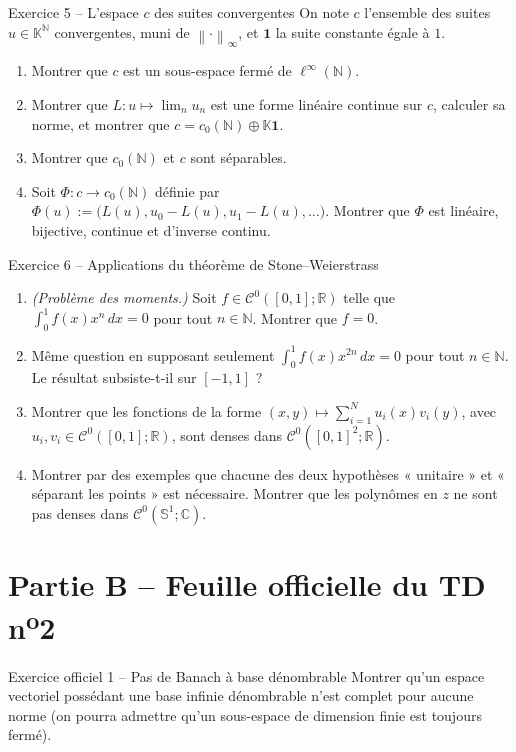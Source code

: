 \documentclass[11pt,a4paper]{article}
\newcommand{\R}{\mathbb{R}}
\newcommand{\N}{\mathbb{N}}
\newcommand{\C}{\mathbb{C}}
\newcommand{\K}{\mathbb{K}}
\newcommand{\Sun}{\mathbb{S}^1}
\newcommand{\norm}[1]{\left\|#1\right\|}
\newcommand{\Cz}{\mathcal{C}^0}
\theoremstyle{definition}
\begin{document}
\begin{exo}{Exercice 5 -- L'espace $c$ des suites convergentes}
On note $c$ l'ensemble des suites $u\in\K^\N$ convergentes, muni de $\norm\cdot_\infty$, et $\mathbf 1$ la suite constante égale à $1$.
\begin{enumerate}[label=(\alph*)]
  \item Montrer que $c$ est un sous-espace fermé de $\ell^\infty(\N)$.
  \item Montrer que $L:u\mapsto\lim_nu_n$ est une forme linéaire continue sur $c$, calculer sa norme, et montrer que $c=c_0(\N)\oplus\K\mathbf 1$.
  \item Montrer que $c_0(\N)$ et $c$ sont séparables.
  \item Soit $\Phi:c\to c_0(\N)$ définie par $\Phi(u):=\big(L(u),u_0-L(u),u_1-L(u),\dots\big)$. Montrer que $\Phi$ est linéaire, bijective, continue et d'inverse continu.
\end{enumerate}
\end{exo}

\begin{exo}{Exercice 6 -- Applications du théorème de Stone--Weierstrass}
\begin{enumerate}[label=(\alph*)]
  \item \emph{(Problème des moments.)} Soit $f\in\Cz([0,1];\R)$ telle que $\int_0^1f(x)x^n\,dx=0$ pour tout $n\in\N$. Montrer que $f=0$.
  \item Même question en supposant seulement $\int_0^1f(x)x^{2n}\,dx=0$ pour tout $n\in\N$. Le résultat subsiste-t-il sur $[-1,1]$ ?
  \item Montrer que les fonctions de la forme $(x,y)\mapsto\sum_{i=1}^Nu_i(x)v_i(y)$, avec $u_i,v_i\in\Cz([0,1];\R)$, sont denses dans $\Cz([0,1]^2;\R)$.
  \item Montrer par des exemples que chacune des deux hypothèses « unitaire » et « séparant les points » est nécessaire. Montrer que les polynômes en $z$ ne sont pas denses dans $\Cz(\Sun;\C)$.
\end{enumerate}
\end{exo}

\section*{Partie B -- Feuille officielle du TD n\textsuperscript{o}2}

\begin{exo}{Exercice officiel 1 -- Pas de Banach à base dénombrable}
Montrer qu'un espace vectoriel possédant une base infinie dénombrable n'est complet pour aucune norme (on pourra admettre qu'un sous-espace de dimension finie est toujours fermé).
\end{exo}
\end{document}
